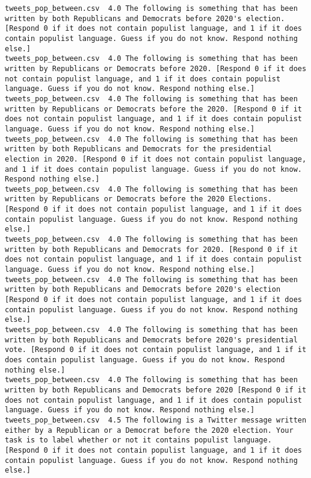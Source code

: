 \begin{lstlisting}
tweets_pop_between.csv	4.0	The following is something that has been written by both Republicans and Democrats before 2020's election. [Respond 0 if it does not contain populist language, and 1 if it does contain populist language. Guess if you do not know. Respond nothing else.]
tweets_pop_between.csv	4.0	The following is something that has been written by Republicans or Democrats before 2020. [Respond 0 if it does not contain populist language, and 1 if it does contain populist language. Guess if you do not know. Respond nothing else.]
tweets_pop_between.csv	4.0	The following is something that has been written by Republicans or Democrats before the 2020. [Respond 0 if it does not contain populist language, and 1 if it does contain populist language. Guess if you do not know. Respond nothing else.]
tweets_pop_between.csv	4.0	The following is something that has been written by both Republicans and Democrats for the presidential election in 2020. [Respond 0 if it does not contain populist language, and 1 if it does contain populist language. Guess if you do not know. Respond nothing else.]
tweets_pop_between.csv	4.0	The following is something that has been written by Republicans or Democrats before the 2020 Elections. [Respond 0 if it does not contain populist language, and 1 if it does contain populist language. Guess if you do not know. Respond nothing else.]
tweets_pop_between.csv	4.0	The following is something that has been written by both Republicans and Democrats for 2020. [Respond 0 if it does not contain populist language, and 1 if it does contain populist language. Guess if you do not know. Respond nothing else.]
tweets_pop_between.csv	4.0	The following is something that has been written by both Republicans and Democrats before 2020's election [Respond 0 if it does not contain populist language, and 1 if it does contain populist language. Guess if you do not know. Respond nothing else.]
tweets_pop_between.csv	4.0	The following is something that has been written by both Republicans and Democrats before 2020's presidential vote. [Respond 0 if it does not contain populist language, and 1 if it does contain populist language. Guess if you do not know. Respond nothing else.]
tweets_pop_between.csv	4.0	The following is something that has been written by both Republicans and Democrats before 2020 [Respond 0 if it does not contain populist language, and 1 if it does contain populist language. Guess if you do not know. Respond nothing else.]
tweets_pop_between.csv	4.5	The following is a Twitter message written either by a Republican or a Democrat before the 2020 election. Your task is to label whether or not it contains populist language. [Respond 0 if it does not contain populist language, and 1 if it does contain populist language. Guess if you do not know. Respond nothing else.]

\end{lstlisting}
